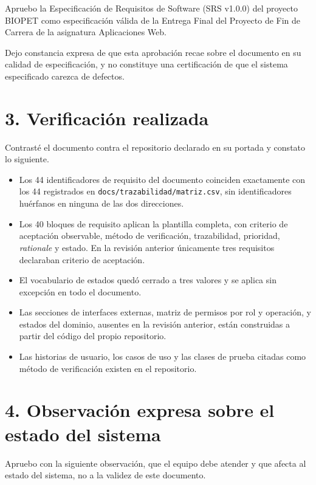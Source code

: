 \documentclass[11pt,letterpaper]{article}
\begin{document}
Apruebo la Especificación de Requisitos de Software (SRS v1.0.0) del proyecto BIOPET como especificación válida de la Entrega Final del Proyecto de Fin de Carrera de la asignatura Aplicaciones Web.

Dejo constancia expresa de que esta aprobación recae sobre el documento en su calidad de especificación, y no constituye una certificación de que el sistema especificado carezca de defectos.

\section*{3. Verificación realizada}

Contrasté el documento contra el repositorio declarado en su portada y constato lo siguiente.

\begin{itemize}
	\item Los 44 identificadores de requisito del documento coinciden exactamente con los 44 registrados en \texttt{docs/trazabilidad/matriz.csv}, sin identificadores huérfanos en ninguna de las dos direcciones.
	\item Los 40 bloques de requisito aplican la plantilla completa, con criterio de aceptación observable, método de verificación, trazabilidad, prioridad, \emph{rationale} y estado. En la revisión anterior únicamente tres requisitos declaraban criterio de aceptación.
	\item El vocabulario de estados quedó cerrado a tres valores y se aplica sin excepción en todo el documento.
	\item Las secciones de interfaces externas, matriz de permisos por rol y operación, y estados del dominio, ausentes en la revisión anterior, están construidas a partir del código del propio repositorio.
	\item Las historias de usuario, los casos de uso y las clases de prueba citadas como método de verificación existen en el repositorio.
\end{itemize}

\vspace{-4pt}
\section*{4. Observación expresa sobre el estado del sistema}

Apruebo con la siguiente observación, que el equipo debe atender y que afecta al estado del sistema, no a la validez de este documento.
\end{document}
